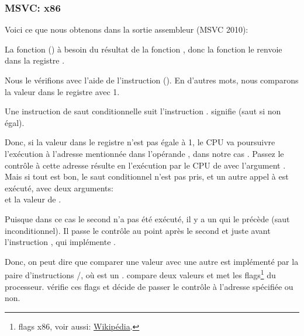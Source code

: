 \subsubsection{MSVC: x86}

Voici ce que nous obtenons dans la sortie assembleur (MSVC 2010):



La fonction  (\main) à besoin du résultat de la fonction
, donc la fonction  le renvoie
dans la registre \EAX.

Nous le vérifions avec l'aide de l'instruction  ().
En d'autres mots, nous comparons la valeur dans le registre \EAX avec 1.

Une instruction de saut conditionnelle \JNE suit l'instruction \CMP. \JNE signifie
 (saut si non égal).

Donc, si la valeur dans le registre \EAX n'est pas égale à 1, le \ac{CPU} va poursuivre
l'exécution à l'adresse mentionnée dans l'opérande \JNE, dans notre cas .
Passez le contrôle à cette adresse résulte en l'exécution par le \ac{CPU} de
\printf avec l'argument .
Mais si tout est bon, le saut conditionnel n'est pas pris, et un autre appel à \printf
est exécuté, avec deux arguments:\\
 et la valeur de .

Puisque dans ce cas le second \printf n'a pas été exécuté, il y a un \JMP qui le précède (saut inconditionnel).
Il passe le contrôle au point après le second \printf et juste avant l'instruction , qui implémente .

Donc, on peut dire que comparer une valeur avec une autre est  implémenté
par la paire d'instructions \CMP/\Jcc, où  est un .
\CMP compare deux valeurs et met les flags\footnote{flags x86, voir aussi: \href{http://go.yurichev.com/17120}{Wikipédia}.}
du processeur.
\Jcc vérifie ces flags et décide de passer le contrôle à l'adresse spécifiée ou non.

